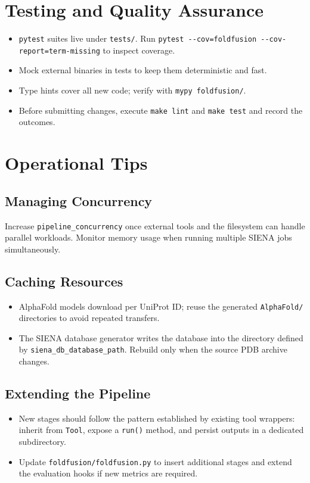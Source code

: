 \documentclass[11pt]{article}
\begin{document}
\section{Testing and Quality Assurance}
\begin{itemize}[noitemsep]
      \item \texttt{pytest} suites live under \texttt{tests/}. Run
            \lstinline[style=commandline]|pytest --cov=foldfusion --cov-report=term-missing|
            to inspect coverage.
      \item Mock external binaries in tests to keep them deterministic and fast.
      \item Type hints cover all new code; verify with \texttt{mypy foldfusion/}.
      \item Before submitting changes, execute \texttt{make lint} and
            \texttt{make test} and record the outcomes.
\end{itemize}

\section{Operational Tips}
\subsection{Managing Concurrency}
Increase \texttt{pipeline\_concurrency} once external tools and the filesystem
can handle parallel workloads. Monitor memory usage when running multiple SIENA
jobs simultaneously.

\subsection{Caching Resources}
\begin{itemize}[noitemsep]
      \item AlphaFold models download per UniProt ID; reuse the generated
            \texttt{AlphaFold/} directories to avoid repeated transfers.
      \item The SIENA database generator writes the database into the directory
            defined by \texttt{siena\_db\_database\_path}. Rebuild only when the
            source PDB archive changes.
\end{itemize}

\subsection{Extending the Pipeline}
\begin{itemize}[noitemsep]
      \item New stages should follow the pattern established by existing tool
            wrappers: inherit from \texttt{Tool}, expose a \texttt{run()} method, and
            persist outputs in a dedicated subdirectory.
      \item Update \texttt{foldfusion/foldfusion.py} to insert additional stages and
            extend the evaluation hooks if new metrics are required.
\end{itemize}
\end{document}
